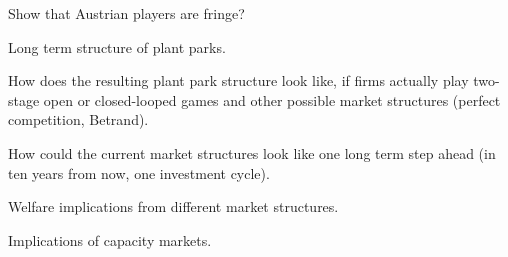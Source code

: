 Show that Austrian players are fringe? 

Long term structure of plant parks.

How does the resulting plant park structure look like, if firms actually play two-stage open or closed-looped games and other possible market structures (perfect competition, Betrand). 

How could the current market structures look like one long term step ahead (in ten years from now, one investment cycle).

Welfare implications from different market structures.

Implications of capacity markets.

